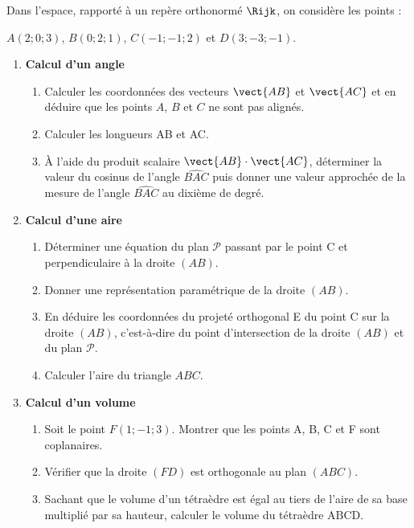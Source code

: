 Dans l’espace, rapporté à un repère orthonormé $\Rijk$, on considère les points :

\smallskip

\hfill{}$A(2;0;3)$, $B(0;2;1)$, $C(-1;-1;2)$ et $D(3;-3;-1)$.\hfill~

\begin{enumerate}
	\item \textbf{Calcul d’un angle}
	\begin{enumerate}
		\item Calculer les coordonnées des vecteurs $\vect{AB}$ et $\vect{AC}$ et en déduire que les points $A$, $B$ et $C$ ne sont pas alignés.
		\item Calculer les longueurs AB et AC.
		\item À l’aide du produit scalaire  $\vect{AB} \cdot \vect{AC}$, déterminer la valeur du cosinus de l’angle $\widehat{BAC}$ puis donner une valeur approchée de la mesure de l'angle $\widehat{BAC}$ au dixième de degré.
	\end{enumerate}
	\item \textbf{Calcul d’une aire}
	\begin{enumerate}
		\item Déterminer une équation du plan $\mathcal{P}$ passant par le point C et perpendiculaire à la droite $(AB)$.
		\item Donner une représentation paramétrique de la droite $(AB)$.
		\item En déduire les coordonnées du projeté orthogonal E du point C sur la droite $(AB)$, c'est-à-dire du point d’intersection de la droite $(AB)$ et du plan $\mathcal{P}$.
		\item Calculer l’aire du triangle $ABC$.
	\end{enumerate}
	\item \textbf{Calcul d’un volume}
	\begin{enumerate}
		\item Soit le point $F(1;-1;3)$. Montrer que les points A, B, C et F sont coplanaires.
		\item Vérifier que la droite $(FD)$ est orthogonale au plan $(ABC)$.
		\item Sachant que le volume d’un tétraèdre est égal au tiers de l’aire de sa base multiplié par sa hauteur, calculer le volume du tétraèdre ABCD.
	\end{enumerate}
\end{enumerate}

